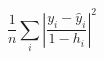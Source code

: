 \documentclass[10pt]{article}
\begin{document}
\[\frac{1}{n}\sum_i \left| \frac{y_i - \hat{y}_i}{1 - h_i} \right|^2
\]
\end{document}
